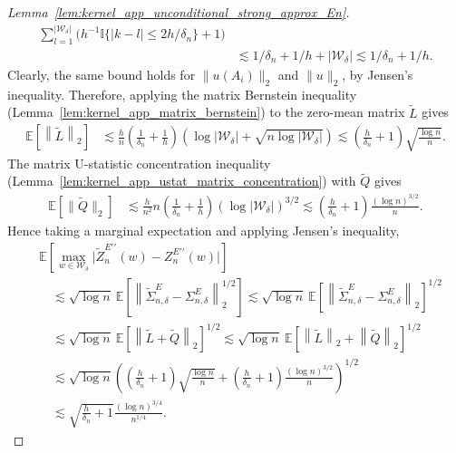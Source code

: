 \documentclass[11pt,lof]{puthesis}
\newcommand{\E}{\ensuremath{\mathbb{E}}}
\newcommand{\I}{\ensuremath{\mathbb{I}}}
\newcommand{\cW}{\ensuremath{\mathcal{W}}}
\newcommand{\dprime}{\ensuremath{\prime\prime}}
\theoremstyle{break}
\theoremstyle{proof}
\newtheorem{proof}{Proof}
\begin{document}
\begin{proof}[Lemma~\ref{lem:kernel_app_unconditional_strong_approx_En}]
\begin{align*}
    \sum_{l=1}^{|\cW_\delta|}
    \Big(
      h^{-1}
      \I\big\{ |k-l| \leq 2h/\delta_n \big\}
      + 1
    \Big) \\
    &\lesssim
    1/\delta_n
    + 1/h
    + |\cW_\delta|
    \lesssim
    1/\delta_n
    + 1/h.
  \end{align*}
  Clearly, the same bound holds for
  $\|u(A_i)\|_2$ and $\|u\|_2$, by Jensen's inequality.
  Therefore, applying the matrix Bernstein inequality
  (Lemma~\ref{lem:kernel_app_matrix_bernstein})
  to the zero-mean matrix $\tilde L$ gives
  \begin{align*}
    \E\left[
      \left\|
        \tilde L
      \right\|_2
    \right]
    &\lesssim
    \frac{h}{n}
    \left(\frac{1}{\delta_n} + \frac{1}{h} \right)
    \left(
      \log |\cW_\delta| + \sqrt{n \log |\cW_\delta|}
    \right)
    \lesssim
    \left(\frac{h}{\delta_n} + 1 \right)
    \sqrt{\frac{\log n}{n}}.
  \end{align*}
  The matrix U-statistic concentration inequality
  (Lemma~\ref{lem:kernel_app_ustat_matrix_concentration})
  with $\tilde Q$ gives
  \begin{align*}
    \E\left[
      \big\|
      \tilde Q
      \big\|_2
    \right]
    &\lesssim
    \frac{h}{n^2}
    n
    \left(\frac{1}{\delta_n} + \frac{1}{h} \right)
    \left(
      \log |\cW_\delta|
    \right)^{3/2}
    \lesssim
    \left(\frac{h}{\delta_n} + 1 \right)
    \frac{(\log n)^{3/2}}{n}.
  \end{align*}
  Hence taking a marginal expectation
  and applying Jensen's inequality,
  \begin{align*}
    &\E\left[
      \max_{w \in \cW_\delta}
      \big|\tilde Z_n^{E\dprime}(w) - Z_n^{E\dprime}(w)\big|
    \right] \\
    &\quad\lesssim
    \sqrt{\log n} \
    \E\left[
      \left\|
        \tilde\Sigma^E_{n,\delta} - \Sigma^E_{n,\delta}
      \right\|_2^{1/2}
    \right]
    \lesssim
    \sqrt{\log n} \
    \E\left[
      \left\|
        \tilde\Sigma^E_{n,\delta} - \Sigma^E_{n,\delta}
      \right\|_2
    \right]^{1/2} \\
    &\quad\lesssim
    \sqrt{\log n} \
    \E\left[
      \left\|
        \tilde L
        + \tilde Q
      \right\|_2
    \right]^{1/2}
    \lesssim
    \sqrt{\log n} \
    \E\left[
      \left\|
        \tilde L
      \right\|_2
      + \left\|
        \tilde Q
      \right\|_2
    \right]^{1/2} \\
    &\quad\lesssim
    \sqrt{\log n}
    \left(
      \left(\frac{h}{\delta_n} + 1 \right)
      \sqrt{\frac{\log n}{n}}
      + \left(\frac{h}{\delta_n} + 1 \right)
      \frac{(\log n)^{3/2}}{n}
    \right)^{1/2} \\
    &\quad\lesssim
    \sqrt{\frac{h}{\delta_n} + 1}
    \frac{(\log n)^{3/4}}{n^{1/4}}.
  \end{align*}


\end{proof}
\end{document}
